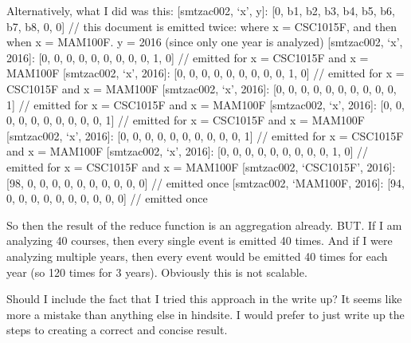 Alternatively, what I did was this:
[smtzac002, ‘x’, y]: [0, b1, b2, b3, b4, b5, b6, b7, b8, 0, 0] // this document is emitted twice: where x = CSC1015F, and then when x = MAM100F. y = 2016 (since only one year is analyzed)
[smtzac002, ‘x’, 2016]: [0, 0, 0, 0, 0, 0, 0, 0, 0, 1, 0] // emitted for x = CSC1015F and x = MAM100F
    [smtzac002, ‘x’, 2016]: [0, 0, 0, 0, 0, 0, 0, 0, 0, 1, 0] // emitted for x = CSC1015F and x = MAM100F
    [smtzac002, ‘x’, 2016]: [0, 0, 0, 0, 0, 0, 0, 0, 0, 0, 1] // emitted for x = CSC1015F and x = MAM100F
    [smtzac002, ‘x’, 2016]: [0, 0, 0, 0, 0, 0, 0, 0, 0, 0, 1] // emitted for x = CSC1015F and x = MAM100F
    [smtzac002, ‘x’, 2016]: [0, 0, 0, 0, 0, 0, 0, 0, 0, 0, 1] // emitted for x = CSC1015F and x = MAM100F
    [smtzac002, ‘x’, 2016]: [0, 0, 0, 0, 0, 0, 0, 0, 0, 1, 0] // emitted for x = CSC1015F and x = MAM100F
    [smtzac002, ‘CSC1015F’, 2016]: [98, 0, 0, 0, 0, 0, 0, 0, 0, 0, 0] // emitted once
    [smtzac002, ‘MAM100F, 2016]: [94, 0, 0, 0, 0, 0, 0, 0, 0, 0, 0] // emitted once


So then the result of the reduce function is an aggregation already. BUT. If I am analyzing 40 courses, then every single event is emitted 40 times. And if I were analyzing multiple years, then every event would be emitted 40 times for each year (so 120 times for 3 years). Obviously this is not scalable.

Should I include the fact that I tried this approach in the write up? It seems like more a mistake than anything else in hindsite. I would prefer to just write up the steps to creating a correct and concise result.

